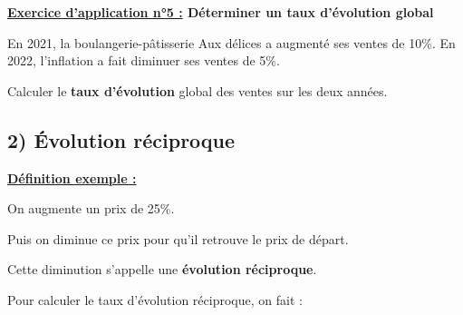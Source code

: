 \documentclass[12pt]{article}
\begin{document}
\begin{mdframed}[
    linewidth=1pt,
    linecolor=RoyalBlue,
    innertopmargin=10pt,
    innerbottommargin=10pt
]
{\color{RoyalBlue}\textbf{\underline{Exercice d'application n°5 :} 
Déterminer un taux d'évolution global}}
\vspace{10pt}

En 2021, la boulangerie-pâtisserie Aux délices a augmenté ses ventes de 10\%. En 2022, l'inflation a fait
diminuer ses ventes de 5\%.

\vspace{5pt}
Calculer le \textbf{taux d'évolution} global des ventes sur les deux années.

\vspace{0.5cm}
{\color{black!27}\dotfill}

\vspace{0.5cm}
{\color{black!27}\dotfill}

\vspace{0.5cm}
{\color{black!27}\dotfill}

\vspace{0.5cm}
{\color{black!27}\dotfill}

\vspace{0.5cm}
{\color{black!27}\dotfill}

\end{mdframed}





\subsection*{\hspace{1cm} 2) Évolution réciproque}

\vspace{5pt}
\underline{{\color{ForestGreen}\bf{Définition exemple :}}}

\vspace{5pt}
On augmente un prix de 25\%. 

Puis on diminue ce prix pour qu’il retrouve le prix de départ.

Cette diminution s’appelle une \textbf{évolution réciproque}.

\vspace{5pt}
Pour calculer le taux d’évolution réciproque, on fait :

\vspace{10pt}
\end{document}
